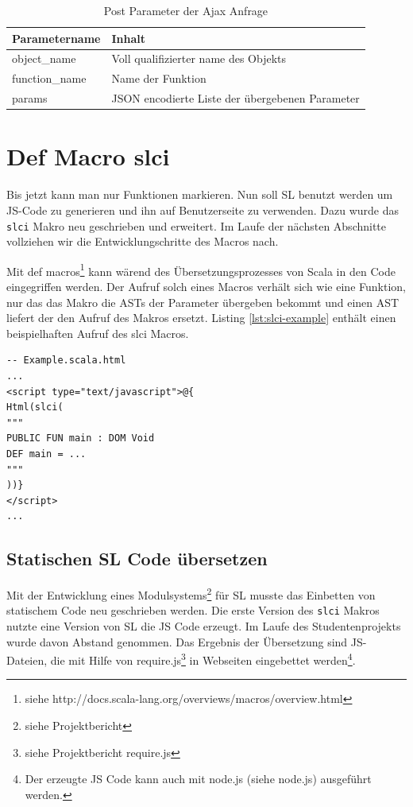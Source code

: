 \documentclass[12pt]{scrreprt}
\begin{document}
\begin{table}[h]
\caption{Post Parameter der Ajax Anfrage}
\centering
\begin{tabular}{ll}
Parametername        &   Inhalt \\
\hline
object\_name   & Voll qualifizierter name des Objekts \\
function\_name & Name der Funktion\\
params         & JSON encodierte Liste der übergebenen Parameter\\
\end{tabular}
\label{tab:post-parameter}
\end{table}

\section{Def Macro slci}
\label{sec:inline-macro}

Bis jetzt kann man nur Funktionen markieren. Nun soll \ac{SL} benutzt werden um \ac{JS}-Code zu generieren und ihn auf Benutzerseite zu verwenden. Dazu wurde das \lstinline!slci! Makro neu geschrieben und erweitert. Im Laufe der nächsten Abschnitte vollziehen wir die Entwicklungschritte des Macros nach.

Mit def macros\footnote{siehe http://docs.scala-lang.org/overviews/macros/overview.html} kann wärend des Übersetzungsprozesses von Scala in den Code eingegriffen werden. Der Aufruf solch eines Macros verhält sich wie eine Funktion, nur das das Makro die \ac{AST}s der Parameter übergeben bekommt und einen \ac{AST} liefert der den Aufruf des Makros ersetzt. Listing \ref{lst:slci-example} enthält einen beispielhaften Aufruf des slci Macros.

\begin{lstlisting}[caption={Beispielaufruf des slci Macros in einer Play View}, label=lst:slci-example, float=h]
-- Example.scala.html
...
<script type="text/javascript">@{
Html(slci(
"""
PUBLIC FUN main : DOM Void
DEF main = ...
"""
))}
</script>
...
\end{lstlisting}

\subsection{Statischen SL Code übersetzen}
\label{subsec:compile-static-sl}

Mit der Entwicklung eines Modulsystems\footnote{siehe Projektbericht} für \ac{SL} musste das Einbetten von statischem Code neu geschrieben werden. Die erste Version des \lstinline!slci! Makros nutzte eine Version von \ac{SL} die \ac{JS} Code erzeugt. Im Laufe des Studentenprojekts wurde davon Abstand genommen. Das Ergebnis der Übersetzung sind \ac{JS}-Dateien, die mit Hilfe von require.js\footnote{siehe Projektbericht require.js} in Webseiten eingebettet werden\footnote{Der erzeugte \ac{JS} Code kann auch mit node.js (siehe node.js) ausgeführt werden.}.
\end{document}
